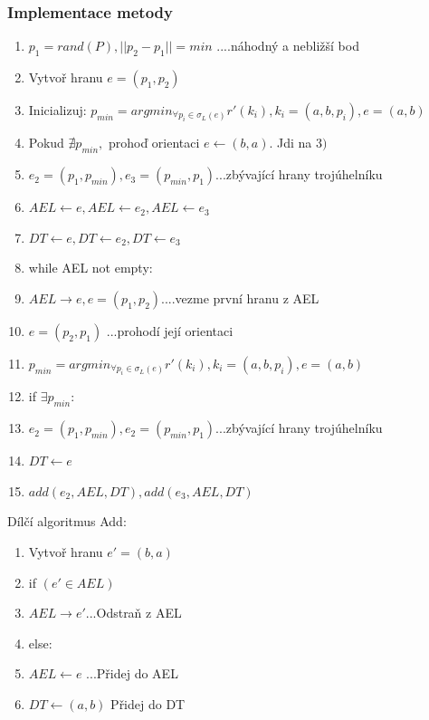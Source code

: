 \documentclass[a4paper, 12pt]{article}
\begin{document}
\subsubsection{Implementace metody}
\begin{enumerate}
\item $ p_1 = rand(P), ||p_2-p_1|| = min $ ....náhodný a nebližší bod
\item Vytvoř hranu $ e = (p_1,p_2) $ 
\item Inicializuj: $p_{min} = arg min_{\forall p_i\in\sigma_L(e)} r'(k_i), k_i = (a, b, p_i), e = (a,b)$
\item Pokud $ \nexists p_{min},$ prohoď orientaci $e \longleftarrow (b,a) $. Jdi na $3)$
\item $e_2 = (p_1,p_{min}), e_3 = (p_{min},p_1) $...zbývající hrany trojúhelníku
\item $AEL \longleftarrow e, AEL \longleftarrow e_2, AEL \longleftarrow e_3 $
\item $DT \longleftarrow e, DT \longleftarrow e_2, DT \longleftarrow e_3 $ 
\item while AEL not empty:
\item \hspace {1cm} $AEL  \longrightarrow e, e = (p_1, p_2) $....vezme první hranu z AEL
\item \hspace {1cm}$ e = (p_2, p_1)$ ...prohodí její orientaci
\item \hspace {1cm} $p_{min} = arg min_{\forall p_i\in\sigma_L(e)} r'(k_i), k_i = (a, b, p_i), e = (a,b) $
\item \hspace {1cm} if $ \exists p_{min}:$
\item \hspace {2cm} $e_2 = (p_1,p_{min}), e_2 = (p_{min},p_1) $...zbývající hrany trojúhelníku
\item \hspace {2cm} $DT \longleftarrow e  $  
\item \hspace {2cm} $ add(e_2,AEL,DT), add(e_3,AEL,DT)$
\end{enumerate}
\clearpage
Dílčí algoritmus Add:
\begin{enumerate}
	\item Vytvoř hranu $e' = (b,a)$
	\item if $(e' \in AEL)$
	\item \hspace {1cm} $ AEL \longrightarrow e'$...Odstraň z AEL
	\item else:
	\item \hspace {1cm} $ AEL \longleftarrow e$ ...Přidej do AEL
	\item $DT\longleftarrow (a,b)$ Přidej do DT
\end{enumerate}
\end{document}
